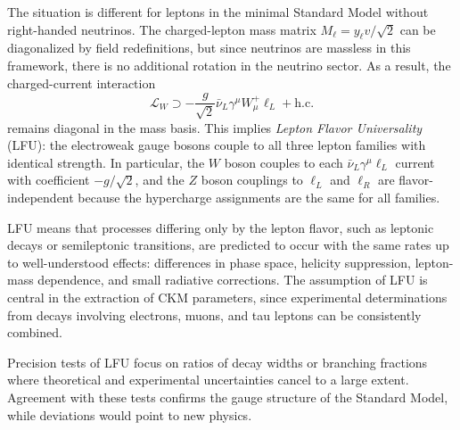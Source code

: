 The situation is different for leptons in the minimal Standard Model without right-handed neutrinos. The charged-lepton mass matrix $M_\ell = y_\ell v/\sqrt{2}$ can be diagonalized by field redefinitions, but since neutrinos are massless in this framework, there is no additional rotation in the neutrino sector. As a result, the charged-current interaction
\begin{equation}
    \mathcal{L}_{W} \supset -\frac{g}{\sqrt{2}} \bar{\nu}_L \gamma^\mu W_\mu^+ \ell_L + \text{h.c.}
\end{equation}
remains diagonal in the mass basis. This implies \textit{Lepton Flavor Universality} (LFU): the electroweak gauge bosons couple to all three lepton families with identical strength. In particular, the $W$ boson couples to each $\bar{\nu}_L \gamma^\mu \ell_L$ current with coefficient $-g/\sqrt{2}$, and the $Z$ boson couplings to $\ell_L$ and $\ell_R$ are flavor-independent because the hypercharge assignments are the same for all families.

LFU means that processes differing only by the lepton flavor, such as leptonic decays or semileptonic transitions, are predicted to occur with the same rates up to well-understood effects: differences in phase space, helicity suppression, lepton-mass dependence, and small radiative corrections. The assumption of LFU is central in the extraction of CKM parameters, since experimental determinations from decays involving electrons, muons, and tau leptons can be consistently combined.

Precision tests of LFU focus on ratios of decay widths or branching fractions where theoretical and experimental uncertainties cancel to a large extent. Agreement with these tests confirms the gauge structure of the Standard Model, while deviations would point to new physics.

